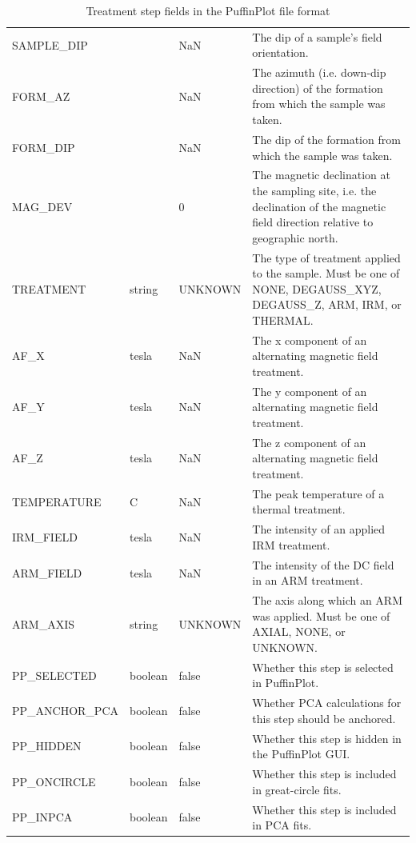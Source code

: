 \documentclass[a4paper,british]{article}
\newcommand{\ppcmd}[1]{\textsf{#1}} %
\begin{document}
\begin{table}
{\begin{tabular}{lllp{10cm}}
\ppcmd{SAMPLE\_DIP} & \textdegree{} & NaN & The dip of a sample's field orientation. \\
\ppcmd{FORM\_AZ} & \textdegree{} & NaN &
The azimuth (i.e. down-dip direction) of the formation from which the
sample was taken. \\
\ppcmd{FORM\_DIP} & \textdegree{} & NaN & The dip of the formation from which the sample was taken. \\
\ppcmd{MAG\_DEV} & \textdegree{} & 0 & The magnetic declination at the sampling site, i.e. the declination of the magnetic field direction relative to geographic north. \\
\ppcmd{TREATMENT} & string & \ppcmd{UNKNOWN} & The type of treatment applied to the sample. Must be one of \ppcmd{NONE}, \ppcmd{DEGAUSS\_XYZ}, \ppcmd{DEGAUSS\_Z}, \ppcmd{ARM}, \ppcmd{IRM}, or \ppcmd{THERMAL}. \\
\ppcmd{AF\_X} & tesla & NaN & The x component of an alternating magnetic field treatment. \\
\ppcmd{AF\_Y} & tesla & NaN & The y component of an alternating magnetic field treatment. \\
\ppcmd{AF\_Z} & tesla & NaN & The z component of an alternating magnetic field treatment. \\
\ppcmd{TEMPERATURE} & \textdegree{}C & NaN & The peak temperature of a thermal treatment. \\
\ppcmd{IRM\_FIELD} & tesla & NaN & The intensity of an applied IRM treatment. \\
\ppcmd{ARM\_FIELD} & tesla & NaN & The intensity of the DC field in an ARM treatment. \\
\ppcmd{ARM\_AXIS} & string & \ppcmd{UNKNOWN} &
The axis along which an ARM was applied. Must be one of \ppcmd{AXIAL}, \ppcmd{NONE}, or \ppcmd{UNKNOWN}. \\
\ppcmd{PP\_SELECTED} & boolean & false & Whether this step is selected in PuffinPlot. \\
\ppcmd{PP\_ANCHOR\_PCA} & boolean & false & Whether PCA calculations for this step should be anchored. \\
\ppcmd{PP\_HIDDEN} & boolean & false & Whether this step is hidden in the PuffinPlot GUI. \\
\ppcmd{PP\_ONCIRCLE} & boolean & false & Whether this step is included in great-circle fits. \\
\ppcmd{PP\_INPCA} & boolean & false & Whether this step is included in PCA fits. \\
\bottomrule
\end{tabular}
}
\caption{Treatment step fields in the PuffinPlot file
  format\label{tbl:treatment-step-fields}}
\end{table}
\end{document}
